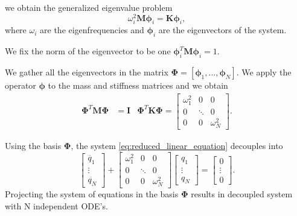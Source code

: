 \documentclass{article}
\begin{document}
we obtain the generalized eigenvalue problem
\begin{equation}
    \omega_i^2 \bm{M}\bm{\phi}_i = \bm{K}\bm{\phi}_i,
\end{equation}
where $\omega_i$ are the eigenfrequencies and $\bm{\phi}_i$ are the eigenvectors of the system.\newline

We fix the norm of the eigenvector to be one $\bm{\phi}_i^T \bm{M} \bm{\phi}_i=1$.\newline

We gather all the eigenvectors in the matrix $\bm{\Phi} = [\bm{\phi}_1,..., \bm{\phi}_N]$. 
We apply the operator $\bm{\phi}$ to the mass and stiffness matrices and we obtain
\begin{align*}
\bm{\Phi}^T \bm{M} \bm{\Phi}&=\bm{I} & \bm{\Phi}^T \bm{K} \bm{\Phi}=\begin{bmatrix}
    \omega_1^2 & 0 & 0\\
    0 & \ddots & 0 \\
    0 & 0 & \omega_N^2
  \end{bmatrix}.
\end{align*}

Using the basis $\bm{\Phi}$, the system \ref{eq:reduced_linear_equation} decouples into
\begin{equation}
    \begin{bmatrix}
        \ddot{q_1} \\
        \vdots\\
        \ddot{q_N}
      \end{bmatrix} + 
      \begin{bmatrix}
        \omega_1^2 & 0 & 0\\
        0 & \ddots & 0 \\
        0 & 0 & \omega_N^2
      \end{bmatrix} \begin{bmatrix}
        q_1 \\
        \vdots\\
        q_N
      \end{bmatrix} = 
      \begin{bmatrix}
        0\\
        \vdots\\
        0
      \end{bmatrix}.
\end{equation}
Projecting the system of equations in the basis $\bm{\Phi}$ results in decoupled system with 
N independent ODE's.\newline
\end{document}
